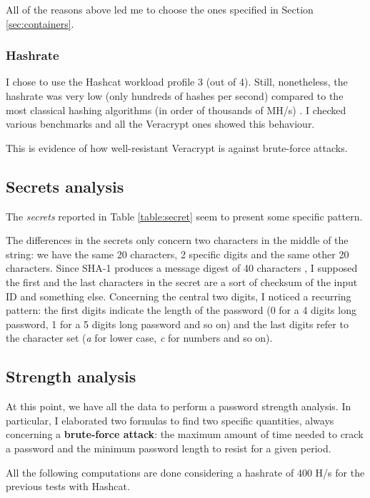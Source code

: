 \documentclass[12pt]{article}
\begin{document}
All of the reasons above led me to choose the ones specified in Section \ref{sec:containers}.

\subsubsection{Hashrate}

I chose to use the Hashcat workload profile 3 (out of 4). Still, nonetheless, the hashrate was very low (only hundreds of hashes per second) compared to the most classical hashing algorithms (in order of thousands of MH/s) \cite{hc-benchmarks}. I checked various benchmarks and all the Veracrypt ones showed this behaviour. 

This is evidence of how well-resistant Veracrypt is against brute-force attacks.

\subsection{Secrets analysis}

The \textit{secrets} reported in Table \ref{table:secret} seem to present some specific pattern.

The differences in the secrets only concern two characters in the middle of the string: we have the same 20 characters, 2 specific digits and the same other 20 characters. Since SHA-1 produces a message digest of 40 characters \cite{sha1}, I supposed the first and the last characters in the secret are a sort of checksum of the input ID and something else. Concerning the central two digits, I noticed a recurring pattern: the first digits indicate the length of the password (0 for a 4 digits long password, 1 for a 5 digits long password and so on) and the last digits refer to the character set (\textit{a} for lower case, \textit{c} for numbers and so on).

\subsection{Strength analysis}

At this point, we have all the data to perform a password strength analysis. In particular, I elaborated two formulas to find two specific quantities, always concerning a \textbf{brute-force attack}: the maximum amount of time needed to crack a password and the minimum password length to resist for a given period. 

All the following computations are done considering a hashrate of 400 H/s for the previous tests with Hashcat.
\end{document}
